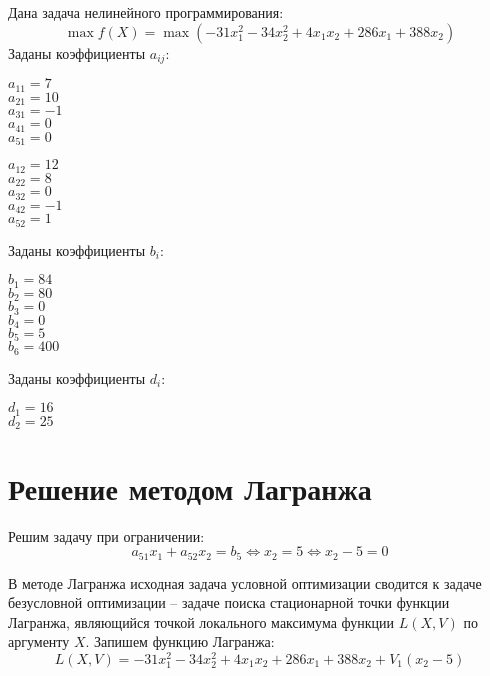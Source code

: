 Дана задача нелинейного программирования:
\begin{equation*}
	\max f(X) = \max \left( -31 x_1^2 - 34 x_2^2 + 4 x_1 x_2 + 286 x_1 + 388 x_2 \right)
\end{equation*}
Заданы коэффициенты $a_{ij}$:
\begin{center}
\begin{multicols}{5}
	$a_{11} = 7$\\
	$a_{21} = 10$\\
	$a_{31} = -1$\\
	$a_{41} = 0$\\
	$a_{51} = 0$\\
\end{multicols}
\begin{multicols}{5}
	$a_{12} = 12$\\
	$a_{22} = 8$\\
	$a_{32} = 0$\\
	$a_{42} = -1$\\
	$a_{52} = 1$\\
\end{multicols}
\end{center}
Заданы коэффициенты $b_i$:
\begin{multicols}{6}
	\centering
	$b_1 = 84$\\
	$b_2 = 80$\\
	$b_3 = 0$\\
	$b_4 = 0$\\
	$b_5 = 5$\\
	$b_6 = 400$\\
\end{multicols}
\noindent Заданы коэффициенты $d_i$:
\begin{multicols}{2}
	\centering
	$d_1 = 16$\\
	$d_2 = 25$\\
\end{multicols}

\section{Решение методом Лагранжа}

Решим задачу при ограничении:
\begin{equation*}
a_{51} x_1 + a_{52} x_2 = b_5 
\Longleftrightarrow
x_2 = 5
\Longleftrightarrow
x_2 - 5 = 0
\end{equation*}

В методе Лагранжа исходная задача условной оптимизации сводится к задаче безусловной оптимизации -- задаче поиска стационарной точки функции Лагранжа, являющийся точкой локального максимума функции $L(X, V)$ по аргументу $X$. Запишем функцию Лагранжа:
\begin{equation*}
L(X, V) = -31 x_1^2 - 34 x_2^2 + 4 x_1 x_2 + 286 x_1 + 388 x_2 + V_1 \left(x_2 - 5\right)
\end{equation*}

